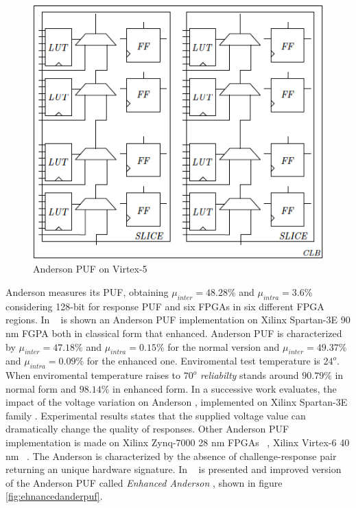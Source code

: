 \documentclass[../tesi.tex]{subfiles}
\begin{document}
\begin{figure}
\centering
\includegraphics[scale=0.40]{images/andersonpufreal.png}
\caption{Anderson PUF on Virtex-5}
\label{fig:andersoncellvirtex}
\end{figure} 
Anderson measures its PUF, obtaining  $\mu_{inter} = 48.28\%$ and $\mu_{intra} = 3.6\%$ considering 128-bit for response PUF and six FPGAs in six different FPGA regions.  
In ~\cite{barbareschi2015implementing} is shown an Anderson PUF implementation on Xilinx Spartan-3E 90 nm FGPA both in classical form that enhanced. Anderson PUF is characterized by $\mu_{inter} = 47.18\%$ and $\mu_{intra} = 0.15\%$ for the normal version and $\mu_{inter} = 49.37\%$ and $\mu_{intra} = 0.09\%$ for the enhanced one. Enviromental test temperature is $24^{o}$. When enviromental temperature raises to $70^{o}$ \emph{reliabilty} stands around $90.79\%$ in normal form and $98.14\%$ in enhanced form. 
In a successive work evaluates, the impact of the voltage variation on Anderson \puf{}, implemented on Xilinx Spartan-3E family \cite{barbareschi2015supply}.  Experimental results states that the supplied voltage value can dramatically change the quality of \puf{} responses. 
Other Anderson PUF implementation is made on Xilinx Zynq-7000 28 nm FPGAs ~\cite{zhang2013design}, Xilinx Virtex-6 40 nm  ~\cite{huang2013delay}.
The Anderson \puf{} is characterized by the absence of challenge-response pair returning an unique hardware signature. In ~\cite{huang2013delay} is presented and improved version of the Anderson PUF called \emph{Enhanced Anderson \puf{}}, shown in figure \ref{fig:ehnancedanderpuf}. 
\end{document}
